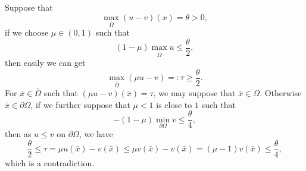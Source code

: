 \documentclass[12pt,a4paper]{ctexart}
\begin{document}
Suppose that 
\begin{equation}
    \max_{\bar \Omega} (u - v) (x) = \theta > 0,
\end{equation}
if we choose $\mu \in (0,1)$ such that 
\begin{equation*}
    (1 - \mu) \max_{\bar \Omega} u \leq \frac{\theta}{2},
\end{equation*}
then easily we can get
\begin{equation*}
    \max_{\bar \Omega} (\mu u - v) =: \tau \geq \frac{\theta}{2}.
\end{equation*}
For $\bar x \in \bar \Omega$ such that $(\mu u - v)(\bar x) = \tau$, we may suppose that $\bar x \in \Omega$. Otherwise $\bar x \in \partial \Omega$, if we further suppose that $\mu < 1$ is close to $1$ such that
\begin{equation*}
    - (1 - \mu) \min_{\partial \Omega} v \leq \frac{\theta}{4},
\end{equation*}
then as $u \leq v$ on $\partial \Omega$, we have
\begin{equation*}
    \frac{\theta}{2} \leq \tau = \mu u(\bar x) - v(\bar x) \leq \mu v(\bar x) - v(\bar x) = (\mu - 1) v(\bar x) \leq \frac{\theta}{4},
\end{equation*}
which is a contradiction. 
\end{document}
